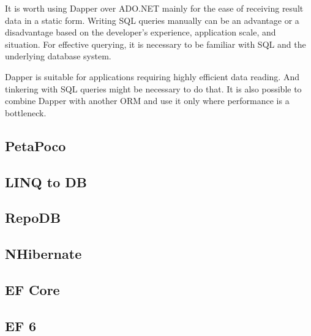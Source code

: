 It is worth using Dapper over ADO.NET mainly for the ease of receiving result data in a static form. Writing SQL queries manually can be an advantage or a disadvantage based on the developer's experience, application scale, and situation. For effective querying, it is necessary to be familiar with SQL and the underlying database system.

Dapper is suitable for applications requiring highly efficient data reading. And tinkering with SQL queries might be necessary to do that. It is also possible to combine Dapper with another ORM and use it only where performance is a bottleneck.


\subsection{PetaPoco}
\subsection{LINQ to DB}
\subsection{RepoDB}
\subsection{NHibernate}
\subsection{EF Core}
\subsection{EF 6}